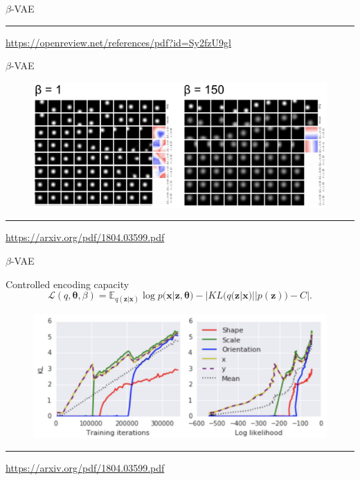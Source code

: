 \documentclass{beamer}
\newcommand{\bx}{\mathbf{x}}
\newcommand{\bz}{\mathbf{z}}
\newcommand{\btheta}{\boldsymbol{\theta}}
\begin{document}
\begin{frame}{$\beta$-VAE}
\begin{minipage}[t]{0.5\columnwidth}
\begin{figure}[h]
		\end{figure}
	\end{minipage}
\vfill
\hrule\medskip
{\scriptsize \href{https://openreview.net/references/pdf?id=Sy2fzU9gl}{https://openreview.net/references/pdf?id=Sy2fzU9gl}}
\end{frame}
\begin{frame}{$\beta$-VAE}
\begin{figure}
    \centering
    \includegraphics[width=\linewidth]{figs/betaVAE_6.png}
\end{figure}
\vfill
\hrule\medskip
{\scriptsize \href{https://arxiv.org/pdf/1804.03599.pdf}{https://arxiv.org/pdf/1804.03599.pdf}}
\end{frame}
\begin{frame}{$\beta$-VAE}
\begin{block}{Controlled encoding capacity}
\vspace{-0.5cm}
\[
    \mathcal{L}(q, \btheta, \beta) = \mathbb{E}_{q(\bz | \bx)} \log p(\bx | \bz, \btheta) - | KL (q(\bz | \bx) || p(\bz)) - C|.
\]
\end{block}
\begin{figure}
    \centering
    \includegraphics[width=\linewidth]{figs/betaVAE_7.png}
\end{figure}
\vfill
\hrule\medskip
{\scriptsize \href{https://arxiv.org/pdf/1804.03599.pdf}{https://arxiv.org/pdf/1804.03599.pdf}}
\end{frame}
\end{document}
